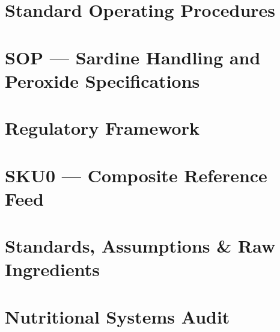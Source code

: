 \documentclass[11pt,oneside]{book}
\begin{document}
\chapter{Standard Operating Procedures}
% 
% 


% 
% 
% 
% 
% 
% 
\chapter{SOP --- Sardine Handling and Peroxide Specifications}


\chapter{Regulatory Framework}

\chapter{SKU0 --- Composite Reference Feed}



\appendix
\growlrrappendixformat
\chapter{Standards, Assumptions \& Raw Ingredients}






\chapter{Nutritional Systems Audit}













\end{document}
